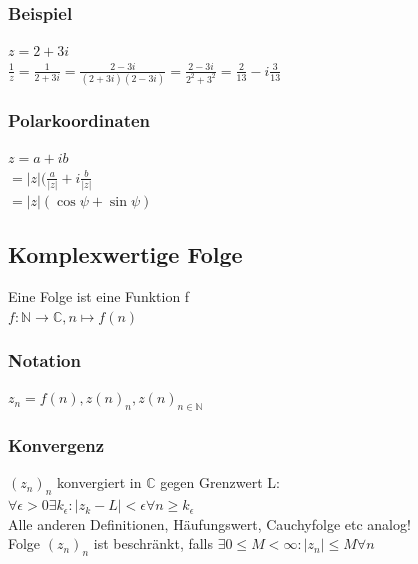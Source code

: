 \documentclass[fleqn]{scrbook}
\begin{document}
\subsubsection{Beispiel} $z = 2 +3i$\\
$\frac{1}{z} = \frac{1}{2+3i} = \frac{2-3i}{(2+3i)(2-3i)} = \frac{2-3i}{2^2 + 3^2} = \frac{2}{13} - i\frac{3}{13}$
\subsubsection{Polarkoordinaten} $z = a + ib$\\
$=|z|(\frac{a}{|z|}+i\frac{b}{|z|}$\\
$=|z|(\cos \psi + \sin \psi)$
\subsection{Komplexwertige Folge} Eine Folge ist eine Funktion f\\
$f:\mathbb{N}\rightarrow \mathbb{C},n\mapsto f(n)$
\subsubsection{Notation} $z_n = f(n),z(n)_n, z(n)_{n\in\mathbb{N}}$
\subsubsection{Konvergenz} $(z_n)_n$ konvergiert in $\mathbb{C}$ gegen Grenzwert L:\\
$\forall\epsilon > 0 \exists k_\epsilon : |z_k - L| < \epsilon \forall n \geq k_\epsilon$\\Alle anderen Definitionen, Häufungswert, Cauchyfolge etc analog!\\
Folge $(z_n)_n$ ist beschränkt, falls $\exists 0 \leq M < \infty:|z_n|\leq M \forall n$
\end{document}
